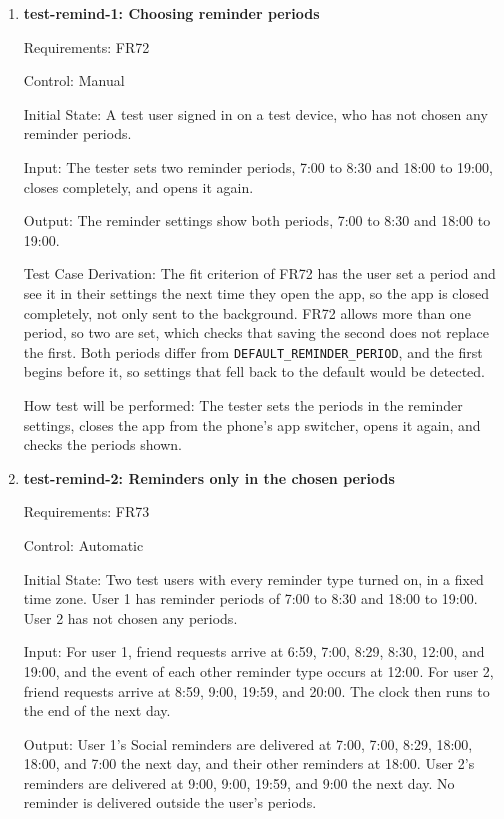 \documentclass[12pt, titlepage]{article}
\begin{document}
\begin{enumerate}

\item{\textbf{test-remind-1: Choosing reminder periods}\\}

Requirements: FR72

Control: Manual

Initial State: A test user signed in on a test device, who has not chosen any
reminder periods.

Input: The tester sets two reminder periods, 7:00 to 8:30 and 18:00 to 19:00,
closes \progname{} completely, and opens it again.

Output: The reminder settings show both periods, 7:00 to 8:30 and 18:00 to
19:00.

Test Case Derivation: The fit criterion of FR72 has the user set a period
and see it in their settings the next time they open the app, so the app is
closed completely, not only sent to the background. FR72 allows more than one
period, so two are set, which checks that saving the second does not replace
the first. Both periods differ from \texttt{DEFAULT\_REMINDER\_PERIOD}, and the
first begins before it, so settings that fell back to the default would be
detected.

How test will be performed: The tester sets the periods in the reminder
settings, closes the app from the phone's app switcher, opens it again, and
checks the periods shown.

\item{\textbf{test-remind-2: Reminders only in the chosen periods}\\}

Requirements: FR73

Control: Automatic

Initial State: Two test users with every reminder type turned on, in a fixed
time zone. User 1 has reminder periods of 7:00 to 8:30 and 18:00 to 19:00.
User 2 has not chosen any periods.

Input: For user 1, friend requests arrive at 6:59, 7:00, 8:29, 8:30, 12:00,
and 19:00, and the event of each other reminder type occurs at 12:00. For
user 2, friend requests arrive at 8:59, 9:00, 19:59, and 20:00. The clock then
runs to the end of the next day.

Output: User 1's Social reminders are delivered at 7:00, 7:00, 8:29, 18:00,
18:00, and 7:00 the next day, and their other reminders at 18:00. User 2's
reminders are delivered at 9:00, 9:00, 19:59, and 9:00 the next day. No
reminder is delivered outside the user's periods.


\end{enumerate}
\end{document}
